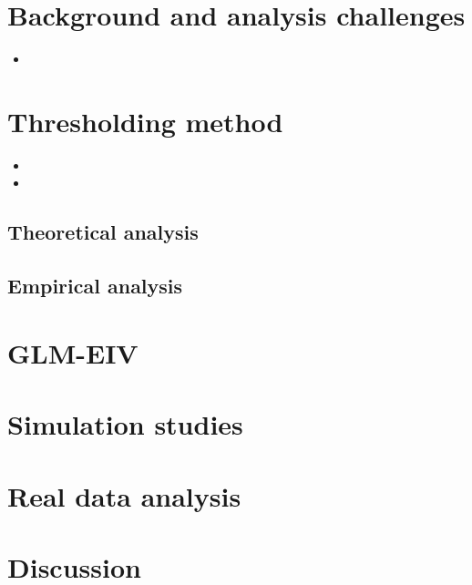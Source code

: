 \documentclass[12pt]{article}
\begin{document}

	
	
\section{Background and analysis challenges}

\begin{itemize}
\item 
\end{itemize}

\section{Thresholding method}

\begin{itemize}
\item 
\item 
\end{itemize}

\subsection{Theoretical analysis}

\subsection{Empirical analysis}

\section{GLM-EIV}

\section{Simulation studies}

\section{Real data analysis}

\section{Discussion}
\end{document}
